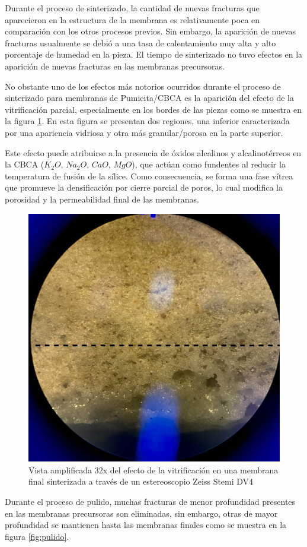 \documentclass{article}
\begin{document}
Durante el proceso de sinterizado, la cantidad de nuevas fracturas 
que aparecieron en la estructura de la membrana es relativamente 
poca en comparación con los otros procesos previos. Sin embargo, la 
aparición de nuevas fracturas usualmente se debió a una tasa de 
calentamiento muy alta y alto porcentaje de humedad en la pieza. 
El tiempo de sinterizado no tuvo efectos en la aparición de nuevas 
fracturas en las membranas precursoras. 

No obstante uno de los efectos más notorios ocurridos durante el proceso 
de sinterizado para membranas de Pumicita/CBCA es la aparición del efecto 
de la vitrificación parcial, especialmente en los bordes de las piezas 
como se muestra en la figura \ref{fig:vitrification}. 
En esta figura se presentan dos regiones, una inferior caracterizada 
por una apariencia vidriosa y otra más granular/porosa en la parte 
superior. 

Este efecto puede atribuirse a la presencia de óxidos 
alcalinos y alcalinotérreos en la CBCA ($K_2O$, $Na_2O$, $CaO$, $MgO$), 
que actúan como fundentes al reducir la temperatura de fusión de la 
sílice. Como consecuencia, se forma una fase vítrea que promueve la 
densificación por cierre parcial de poros, lo cual modifica la 
porosidad y la permeabilidad final de las membranas. 

\begin{figure}[!htbp]
    \centering
    \includegraphics[width=0.5\linewidth]{Graphics/Densification.jpg}
    \caption{Vista amplificada 32x del efecto de la vitrificación en una membrana final 
    sinterizada a través de un estereoscopio Zeiss Stemi DV4}
    \label{fig:vitrification}
\end{figure}

Durante el proceso de pulido, muchas fracturas de menor profundidad 
presentes en las membranas precursoras son eliminadas, sin embargo, 
otras de mayor profundidad se mantienen hasta las membranas finales 
como se muestra en la figura \ref{fig:pulido}. 
\end{document}
